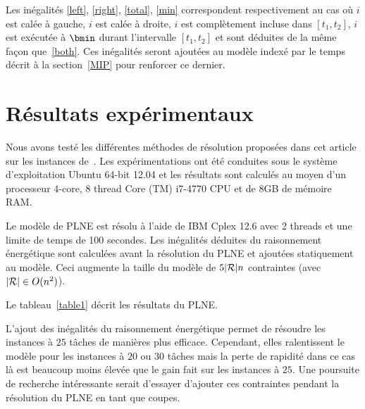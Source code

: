 Les inégalités \eqref{left}, \eqref{right}, \eqref{total}, \eqref{min}
correspondent respectivement au cas où $i$ est calée à gauche, $i$ est
calée à droite, $i$ est complètement incluse dans $[t_1,t_2]$, $i$ est
exécutée à $\bmin$ durant l'intervalle $[t_1,t_2]$ et sont déduites de
la même façon que~\eqref{both}.  Ces inégalités seront ajoutées au
modèle indexé par le temps décrit à la section~\ref{MIP} pour
renforcer ce dernier. 
 
\section{Résultats expérimentaux}

Nous avons testé les différentes méthodes de résolution proposées dans
cet article sur les instances de~\cite{Nattaf2015}. Les
expérimentations ont été conduites sous le système d'exploitation
Ubuntu 64-bit 12.04 et les résultats sont calculés au moyen d'un
processeur 4-core, 8 thread Core (TM) i7-4770 CPU et de 8GB de mémoire
RAM. 

Le modèle de PLNE est résolu à l'aide de IBM Cplex 12.6 avec 2 threads
et une limite de temps de 100 secondes. Les inégalités déduites du
raisonnement énergétique sont calculées avant la résolution du PLNE et
ajoutées statiquement au modèle. Ceci augmente la taille du modèle de
$5|{\cal R}|n$ contraintes (avec $|{\cal R}| \in O(n^2)$). 

Le tableau~\ref{table1} décrit les résultats du PLNE. 

L'ajout des inégalités du raisonnement énergétique permet de résoudre
les instances à $25$ tâches de manières plus efficace. Cependant, elles
ralentissent le modèle pour les instances à $20$ ou $30$ tâches mais
la perte de rapidité dans ce cas là est beaucoup moins élevée que le
gain fait sur les instances à $25$. Une poursuite de recherche
intéressante serait d'essayer d'ajouter ces contraintes pendant la
résolution du PLNE en tant que coupes. 

